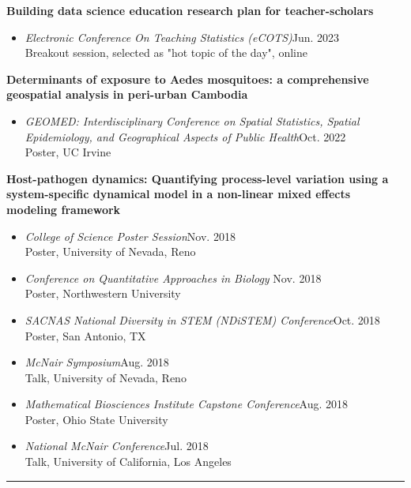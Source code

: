 \documentclass{article}
\begin{document}
\begin{description}
		\textbf{Building data science education research plan for teacher-scholars}
		\begin{itemize}
			\item \textit{Electronic Conference On Teaching Statistics (eCOTS)}\hfill{Jun. 2023}\\
			Breakout session, selected as "hot topic of the day", online
		\end{itemize}
		
		\textbf{Determinants of exposure to Aedes mosquitoes: a comprehensive geospatial analysis in peri-urban Cambodia}
		\begin{itemize}
			\item \textit{GEOMED: Interdisciplinary Conference on Spatial Statistics, Spatial Epidemiology, and Geographical Aspects of Public Health}\hfill{Oct. 2022}\\
			Poster, UC Irvine
		\end{itemize}
		
		\textbf{Host-pathogen dynamics: Quantifying process-level variation using a system-specific dynamical model in a non-linear mixed effects modeling framework}
		\begin{itemize}
			\item \textit{College of Science Poster Session}\hfill{Nov. 2018}\\
			Poster, University of Nevada, Reno 
			
			\item \textit{Conference on Quantitative Approaches in Biology} \hfill{Nov. 2018}\\
			Poster, Northwestern University 
			
			\item \textit{SACNAS National Diversity in STEM (NDiSTEM) Conference}\hfill{Oct. 2018}\\ 
			Poster, San Antonio, TX
			
			\item \textit{McNair Symposium}\hfill{Aug. 2018}\\
			Talk, University of Nevada, Reno 
			
			\item \textit{Mathematical Biosciences Institute Capstone Conference}\hfill{Aug. 2018}\\
			Poster, Ohio State University
			
			\item \textit{National McNair Conference}\hfill{Jul. 2018}\\
			Talk, University of California, Los Angeles
		\end{itemize}
		
	\end{description}
	\vspace{-2mm}
	\rule{\linewidth}{1pt}
	
\end{document}
